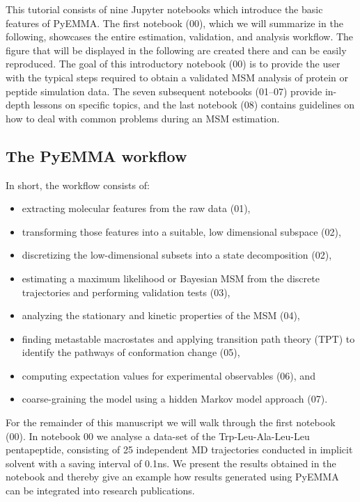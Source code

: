 \documentclass[9pt,tutorial]{livecoms}
\begin{document}
This tutorial consists of nine Jupyter notebooks which introduce the basic features of PyEMMA.
The first notebook (00), which we will summarize in the following, showcases the entire estimation, validation, and analysis workflow. 
The figure that will be displayed in the following are created there and can be easily reproduced.
The goal of this introductory notebook (00) is to provide the user with the typical steps required to obtain a validated MSM analysis of protein or peptide simulation data.
The seven subsequent notebooks (01--07) provide in-depth lessons on specific topics, and the last notebook (08) contains guidelines on how to deal with common problems during an MSM estimation.

\subsection{The PyEMMA workflow}

In short, the workflow consists of:
\begin{itemize}
	\item extracting molecular features from the raw data (01),
	\item transforming those features into a suitable, low dimensional subspace (02),
	\item discretizing the low-dimensional subsets into a state decomposition (02),
	\item estimating a maximum likelihood or Bayesian MSM from the discrete trajectories and performing validation tests (03),
	\item analyzing the stationary and kinetic properties of the MSM (04),
	\item finding metastable macrostates and applying transition path theory (TPT) to identify the pathways of conformation change (05),
	\item computing expectation values for experimental observables (06), and
	\item coarse-graining the model using a hidden Markov model approach (07).
\end{itemize}

For the remainder of this manuscript we will walk through the first notebook (00). In notebook 00 we analyse a data-set of the Trp-Leu-Ala-Leu-Leu pentapeptide, consisting of 25 independent MD trajectories conducted in implicit solvent with a saving interval of 0.1ns. We present the results obtained in the notebook and thereby give an example how results generated using PyEMMA can be integrated into research publications.
\end{document}
